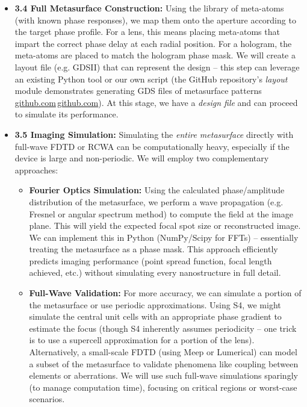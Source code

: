 \documentclass[11pt]{article}
\begin{document}
\begin{itemize}
  \item \textbf{3.4 Full Metasurface Construction:} Using the library of meta-atoms (with known phase responses), we map them onto the aperture according to the target phase profile. For a lens, this means placing meta-atoms that impart the correct phase delay at each radial position. For a hologram, the meta-atoms are placed to match the hologram phase mask. We will create a layout file (e.g. GDSII) that can represent the design -- this step can leverage an existing Python tool or our own script (the GitHub repository's \emph{layout} module demonstrates generating GDS files of metasurface patterns\,\href{https://github.com/hzzg0727/Metasurface-Design#:~:text=layout}{github.com}\,\href{https://github.com/hzzg0727/Metasurface-Design#:~:text=The%20,this%20directory%20are%20as%20follows}{github.com}). At this stage, we have a \emph{design file} and can proceed to simulate its performance.
  \item \textbf{3.5 Imaging Simulation:} Simulating the \emph{entire metasurface} directly with full-wave FDTD or RCWA can be computationally heavy, especially if the device is large and non-periodic. We will employ two complementary approaches:
  \begin{itemize}[leftmargin=2em]
    \item[(a)] \textbf{Fourier Optics Simulation:} Using the calculated phase/amplitude distribution of the metasurface, we perform a wave propagation (e.g. Fresnel or angular spectrum method) to compute the field at the image plane. This will yield the expected focal spot size or reconstructed image. We can implement this in Python (NumPy/Scipy for FFTs) -- essentially treating the metasurface as a phase mask. This approach efficiently predicts imaging performance (point spread function, focal length achieved, etc.) without simulating every nanostructure in full detail.
    \item[(b)] \textbf{Full-Wave Validation:} For more accuracy, we can simulate a portion of the metasurface or use periodic approximations. Using S4, we might simulate the central unit cells with an appropriate phase gradient to estimate the focus (though S4 inherently assumes periodicity -- one trick is to use a supercell approximation for a portion of the lens). Alternatively, a small-scale FDTD (using Meep or Lumerical) can model a subset of the metasurface to validate phenomena like coupling between elements or aberrations. We will use such full-wave simulations sparingly (to manage computation time), focusing on critical regions or worst-case scenarios.

\end{itemize}
\end{itemize}
\end{document}
